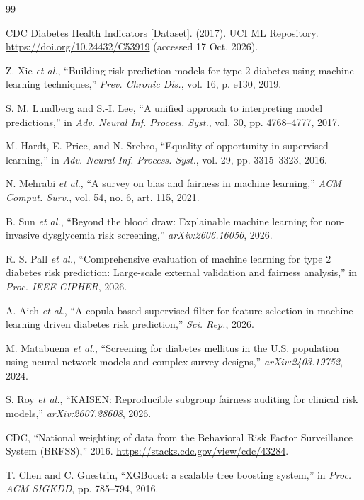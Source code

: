 \documentclass[conference]{IEEEtran}
\begin{document}
\begin{thebibliography}{99}

CDC Diabetes Health Indicators [Dataset]. (2017). UCI ML Repository. \url{https://doi.org/10.24432/C53919} (accessed 17 Oct. 2026).

Z. Xie \textit{et al.}, ``Building risk prediction models for type 2 diabetes using machine learning techniques,'' \textit{Prev. Chronic Dis.}, vol. 16, p. e130, 2019.

S. M. Lundberg and S.-I. Lee, ``A unified approach to interpreting model predictions,'' in \textit{Adv. Neural Inf. Process. Syst.}, vol. 30, pp. 4768--4777, 2017.

M. Hardt, E. Price, and N. Srebro, ``Equality of opportunity in supervised learning,'' in \textit{Adv. Neural Inf. Process. Syst.}, vol. 29, pp. 3315--3323, 2016.

N. Mehrabi \textit{et al.}, ``A survey on bias and fairness in machine learning,'' \textit{ACM Comput. Surv.}, vol. 54, no. 6, art. 115, 2021.

B. Sun \textit{et al.}, ``Beyond the blood draw: Explainable machine learning for non-invasive dysglycemia risk screening,'' \textit{arXiv:2606.16056}, 2026.

R. S. Pall \textit{et al.}, ``Comprehensive evaluation of machine learning for type 2 diabetes risk prediction: Large-scale external validation and fairness analysis,'' in \textit{Proc. IEEE CIPHER}, 2026.

A. Aich \textit{et al.}, ``A copula based supervised filter for feature selection in machine learning driven diabetes risk prediction,'' \textit{Sci. Rep.}, 2026.

M. Matabuena \textit{et al.}, ``Screening for diabetes mellitus in the U.S. population using neural network models and complex survey designs,'' \textit{arXiv:2403.19752}, 2024.

S. Roy \textit{et al.}, ``KAISEN: Reproducible subgroup fairness auditing for clinical risk models,'' \textit{arXiv:2607.28608}, 2026.


CDC, ``National weighting of data from the Behavioral Risk Factor Surveillance System (BRFSS),'' 2016. \url{https://stacks.cdc.gov/view/cdc/43284}.


T. Chen and C. Guestrin, ``XGBoost: a scalable tree boosting system,'' in \textit{Proc. ACM SIGKDD}, pp. 785--794, 2016.


\end{thebibliography}
\end{document}
